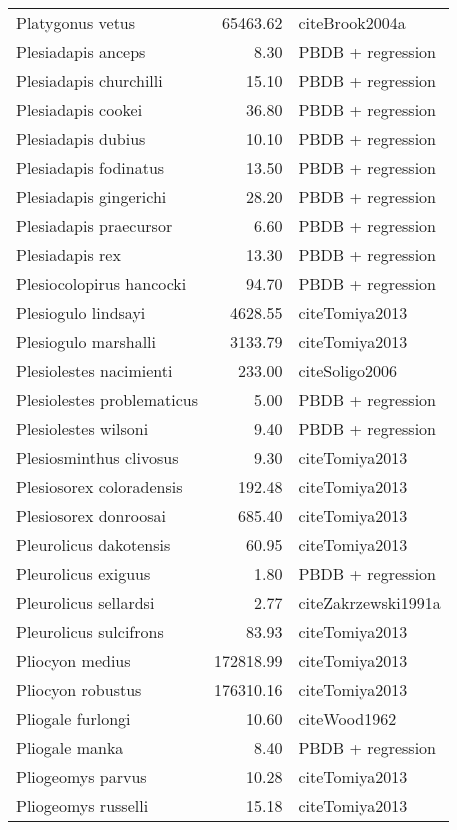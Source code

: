 \begin{table}[ht]
\begin{tabular}{lrl}
  Platygonus vetus & 65463.62 & cite{Brook2004a} \\ 
  Plesiadapis anceps & 8.30 & PBDB + regression \\ 
  Plesiadapis churchilli & 15.10 & PBDB + regression \\ 
  Plesiadapis cookei & 36.80 & PBDB + regression \\ 
  Plesiadapis dubius & 10.10 & PBDB + regression \\ 
  Plesiadapis fodinatus & 13.50 & PBDB + regression \\ 
  Plesiadapis gingerichi & 28.20 & PBDB + regression \\ 
  Plesiadapis praecursor & 6.60 & PBDB + regression \\ 
  Plesiadapis rex & 13.30 & PBDB + regression \\ 
  Plesiocolopirus hancocki & 94.70 & PBDB + regression \\ 
  Plesiogulo lindsayi & 4628.55 & cite{Tomiya2013} \\ 
  Plesiogulo marshalli & 3133.79 & cite{Tomiya2013} \\ 
  Plesiolestes nacimienti & 233.00 & cite{Soligo2006} \\ 
  Plesiolestes problematicus & 5.00 & PBDB + regression \\ 
  Plesiolestes wilsoni & 9.40 & PBDB + regression \\ 
  Plesiosminthus clivosus & 9.30 & cite{Tomiya2013} \\ 
  Plesiosorex coloradensis & 192.48 & cite{Tomiya2013} \\ 
  Plesiosorex donroosai & 685.40 & cite{Tomiya2013} \\ 
  Pleurolicus dakotensis & 60.95 & cite{Tomiya2013} \\ 
  Pleurolicus exiguus & 1.80 & PBDB + regression \\ 
  Pleurolicus sellardsi & 2.77 & cite{Zakrzewski1991a} \\ 
  Pleurolicus sulcifrons & 83.93 & cite{Tomiya2013} \\ 
  Pliocyon medius & 172818.99 & cite{Tomiya2013} \\ 
  Pliocyon robustus & 176310.16 & cite{Tomiya2013} \\ 
  Pliogale furlongi & 10.60 & cite{Wood1962} \\ 
  Pliogale manka & 8.40 & PBDB + regression \\ 
  Pliogeomys parvus & 10.28 & cite{Tomiya2013} \\ 
  Pliogeomys russelli & 15.18 & cite{Tomiya2013} \\ 

\end{tabular}
\end{table}
